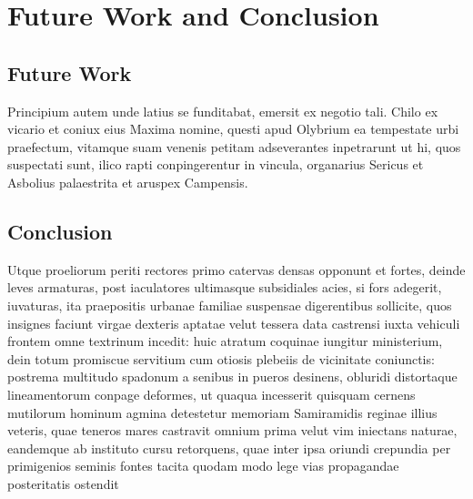 \chapter{Future Work and Conclusion}
\label{chap:conclusion}
\section{Future Work}
Principium autem unde latius se funditabat, emersit ex negotio tali. Chilo ex vicario et coniux eius Maxima nomine, questi apud Olybrium ea tempestate urbi praefectum, vitamque suam venenis petitam adseverantes inpetrarunt ut hi, quos suspectati sunt, ilico rapti conpingerentur in vincula, organarius Sericus et Asbolius palaestrita et aruspex Campensis.

\section{Conclusion}
Utque proeliorum periti rectores primo catervas densas opponunt et fortes, deinde leves armaturas, post iaculatores ultimasque subsidiales acies, si fors adegerit, iuvaturas, ita praepositis urbanae familiae suspensae digerentibus sollicite, quos insignes faciunt virgae dexteris aptatae velut tessera data castrensi iuxta vehiculi frontem omne textrinum incedit: huic atratum coquinae iungitur ministerium, dein totum promiscue servitium cum otiosis plebeiis de vicinitate coniunctis: postrema multitudo spadonum a senibus in pueros desinens, obluridi distortaque lineamentorum conpage deformes, ut quaqua incesserit quisquam cernens mutilorum hominum agmina detestetur memoriam Samiramidis reginae illius veteris, quae teneros mares castravit omnium prima velut vim iniectans naturae, eandemque ab instituto cursu retorquens, quae inter ipsa oriundi crepundia per primigenios seminis fontes tacita quodam modo lege vias propagandae posteritatis ostendit